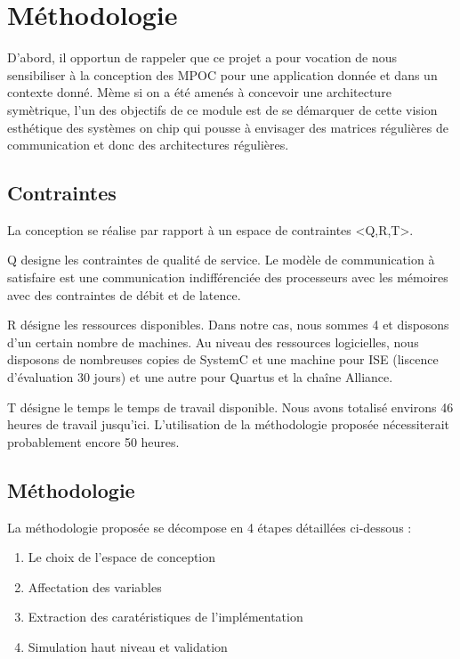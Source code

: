 \section{Méthodologie}

D'abord, il opportun de rappeler que ce projet a pour vocation de nous sensibiliser à la conception des MPOC pour une application donnée et dans un contexte donné. Mème si on a été amenés à concevoir une architecture symètrique, l'un des objectifs de ce module est de se démarquer de cette vision esthétique des systèmes on chip qui pousse à envisager des matrices régulières de communication et donc des architectures régulières.

\subsection{Contraintes}

La conception se réalise par rapport à un espace de contraintes <Q,R,T>.

Q designe les contraintes de qualité de service. Le modèle de communication à satisfaire est une communication indifférenciée des processeurs avec les mémoires avec des contraintes de débit et de latence.

R désigne les ressources disponibles. Dans notre cas, nous sommes 4 et disposons d'un certain nombre de machines. Au niveau des ressources logicielles, nous disposons de nombreuses copies de SystemC et une machine pour ISE (liscence d'évaluation 30 jours) et une autre pour Quartus et la chaîne Alliance.

T désigne le temps le temps de travail disponible. Nous avons totalisé environs 46 heures de travail jusqu'ici. L'utilisation de la méthodologie proposée nécessiterait probablement encore 50 heures.

\subsection{Méthodologie}

La méthodologie proposée se décompose en 4 étapes détaillées ci-dessous :
\begin{enumerate}
\item Le choix de l'espace de conception
\item Affectation des variables
\item Extraction des caratéristiques de l'implémentation
\item Simulation haut niveau et validation
\end{enumerate}

